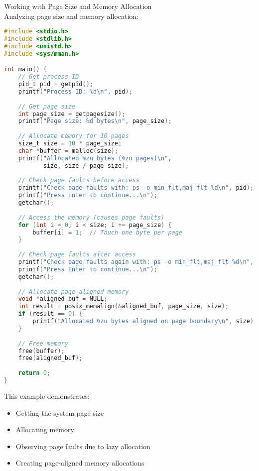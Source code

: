 \begin{example2}{Working with Page Size and Memory Allocation}\\
    Analyzing page size and memory allocation:
    
\begin{lstlisting}[language=C, style=basesmol]
#include <stdio.h>
#include <stdlib.h>
#include <unistd.h>
#include <sys/mman.h>

int main() {
    // Get process ID
    pid_t pid = getpid();
    printf("Process ID: %d\n", pid);
    
    // Get page size
    int page_size = getpagesize();
    printf("Page size: %d bytes\n", page_size);
    
    // Allocate memory for 10 pages
    size_t size = 10 * page_size;
    char *buffer = malloc(size);
    printf("Allocated %zu bytes (%zu pages)\n", 
           size, size / page_size);
    
    // Check page faults before access
    printf("Check page faults with: ps -o min_flt,maj_flt %d\n", pid);
    printf("Press Enter to continue...\n");
    getchar();
    
    // Access the memory (causes page faults)
    for (int i = 0; i < size; i += page_size) {
        buffer[i] = 1;  // Touch one byte per page
    }
    
    // Check page faults after access
    printf("Check page faults again with: ps -o min_flt,maj_flt %d\n", pid);
    printf("Press Enter to continue...\n");
    getchar();
    
    // Allocate page-aligned memory
    void *aligned_buf = NULL;
    int result = posix_memalign(&aligned_buf, page_size, size);
    if (result == 0) {
        printf("Allocated %zu bytes aligned on page boundary\n", size);
    }
    
    // Free memory
    free(buffer);
    free(aligned_buf);
    
    return 0;
}
\end{lstlisting}

    This example demonstrates:
    \begin{itemize}
        \item Getting the system page size
        \item Allocating memory
        \item Observing page faults due to lazy allocation
        \item Creating page-aligned memory allocations
    \end{itemize}
\end{example2}